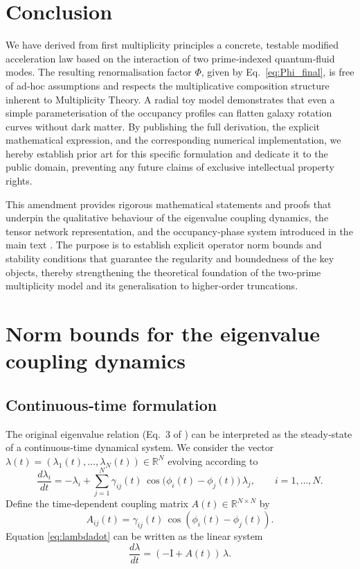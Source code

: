 \documentclass[11pt,a4paper]{article}
\theoremstyle{definition}
\theoremstyle{remark}
\newcommand{\R}{\mathbb{R}}
\begin{document}
\section{Conclusion}
We have derived from first multiplicity principles a concrete, testable modified acceleration law based on the interaction of two prime‑indexed quantum‑fluid modes.
The resulting renormalisation factor $\Phi$, given by Eq.~\eqref{eq:Phi_final}, is free of ad‑hoc assumptions and respects the multiplicative composition structure inherent to Multiplicity Theory.
A radial toy model demonstrates that even a simple parameterisation of the occupancy profiles can flatten galaxy rotation curves without dark matter.
By publishing the full derivation, the explicit mathematical expression, and the corresponding numerical implementation, we hereby establish prior art for this specific formulation and dedicate it to the public domain, preventing any future claims of exclusive intellectual property rights.

This amendment provides rigorous mathematical statements and proofs that underpin the qualitative behaviour of the eigenvalue coupling dynamics, the tensor network representation, and the occupancy‑phase system introduced in the main text \cite{VanGelder2026}.  
The purpose is to establish explicit operator norm bounds and stability conditions that guarantee the regularity and boundedness of the key objects, thereby strengthening the theoretical foundation of the two‑prime multiplicity model and its generalisation to higher‑order truncations.

\section{Norm bounds for the eigenvalue coupling dynamics}
\label{sec:eigenbounds}

\subsection{Continuous‑time formulation}
The original eigenvalue relation (Eq.~3 of \cite{VanGelder2026}) can be interpreted as the steady‑state of a continuous‑time dynamical system.  
We consider the vector \(\lambda(t)=(\lambda_1(t),\dots,\lambda_N(t))\in\R^N\) evolving according to
\begin{equation}\label{eq:lambdadot}
\frac{d\lambda_i}{dt} = -\lambda_i + \sum_{j=1}^N \gamma_{ij}(t)\,\cos\bigl(\phi_i(t)-\phi_j(t)\bigr)\,\lambda_j, \qquad i=1,\dots,N.
\end{equation}
Define the time‑dependent coupling matrix \(A(t)\in\R^{N\times N}\) by
\[
A_{ij}(t) = \gamma_{ij}(t)\,\cos(\phi_i(t)-\phi_j(t)).
\]
Equation \eqref{eq:lambdadot} can be written as the linear system
\[
\frac{d\lambda}{dt} = (-\mathrm{I}+A(t))\,\lambda .
\]
\end{document}
